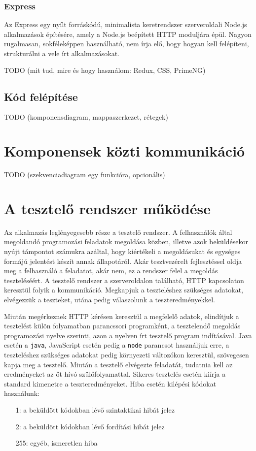\documentclass{elteikthesis}
\begin{document}
				\subsubsection{Express}
					Az Express \cite{express} egy nyílt forráskódú, minimalista keretrendszer szerveroldali Node.js alkalmazások építésére, amely a Node.js beépített HTTP moduljára épül. Nagyon rugalmasan, sokféleképpen használható, nem írja elő, hogy hogyan kell felépíteni, strukturálni a vele írt alkalmazásokat.

			TODO (mit tud, mire és hogy használom: Redux, CSS, PrimeNG)
			
			\subsection{Kód felépítése}
			TODO (komponensdiagram, mappaszerkezet, rétegek)
		
		\section{Komponensek közti kommunikáció}
		TODO (szekvenciadiagram egy funkcióra, opcionális)

		\section{A tesztelő rendszer működése}
			Az alkalmazás leglényegesebb része a tesztelő rendszer. A felhasználók által megoldandó programozási feladatok megoldása közben, illetve azok beküldésekor nyújt támpontot számukra azáltal, hogy kiértékeli a megoldásukat és egységes formájú jelentést készít annak állapotáról. Akár tesztvezérelt fejlesztéssel oldja meg a felhasználó a feladatot, akár nem, ez a rendszer felel a megoldás teszteléséért. A tesztelő rendszer a szerveroldalon található, HTTP kapcsolaton keresztül folyik a kommunikáció. Megkapjuk a teszteléshez szükséges adatokat, elvégezzük a teszteket, utána pedig válaszolunk a teszteredményekkel.
			
			Miután megérkeznek HTTP kérésen keresztül a megfelelő adatok, elindítjuk a tesztelést külön folyamatban parancssori programként, a tesztelendő megoldás programozási nyelve szerinti, azon a nyelven írt tesztelő program indításával. Java esetén a \texttt{java}, JavaScript esetén pedig a \texttt{node} parancsot használjuk erre, a teszteléshez szükséges adatokat pedig környezeti változókon keresztül, szövegesen kapja meg a tesztelő. Miután a tesztelő elvégezte feladatát, tudatnia kell az eredményeket az őt hívó szülőfolyamattal. Sikeres tesztelés esetén kiírja a standard kimenetre a teszteredményeket. Hiba esetén kilépési kódokat használunk:
			\begin{itemize}
				\setlength\itemsep{-0.5em}
				\item[1:] a beküldött kódokban lévő szintaktikai hibát jelez
				\item[2:] a beküldött kódokban lévő fordítási hibát jelez
				\item[255:] egyéb, ismeretlen hiba
			\end{itemize}
\end{document}

